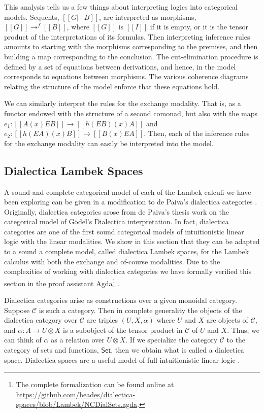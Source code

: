 \documentclass{article}
\let\mto\to                     %
\let\to\relax                   %
\newcommand{\to}{\rightarrow}
\newcommand{\cat}[1]{\mathcal{#1}}
\newcommand{\Set}{\mathsf{Set}}
\begin{document}
This analysis tells us a few things about interpreting logics into
categorical models.  Sequents, $[[G |- B]]$, are interpreted as
morphisms, $[[G]] \mto^f [[B]]$, where $[[G]]$ is $[[I]]$ if it is
empty, or it is the tensor product of the interpretations of its
formulas.  Then interpreting inference rules amounts to starting with
the morphisms corresponding to the premises, and then building a map
corresponding to the conclusion.  The cut-elimination procedure is
defined by a set of equations between derivations, and hence, in the
model corresponds to equations between morphisms.  The various
coherence diagrams relating the structure of the model enforce that
these equations hold.

We can similarly interpret the rules for the exchange modality.
That is, as a functor endowed with the structure of a second comonad,
but also with the maps $e_1 : [[A (x) E B]] \mto [[h(E B) (x) A]]$ and
$e_2 : [[h(E A) (x) B]] \mto [[B (x) E A]]$.  Then, each of the
inference rules for the exchange modality can easily be interpreted
into the model.

\subsection{Dialectica Lambek Spaces}
\label{sec:dialectica_lambek_spaces}

A sound and complete categorical model of each of the Lambek calculi
we have been exploring can be given in a modification to de Paiva's
dialectica categories \cite{depaiva1990}.  Originally, dialectica
categories arose from de Paiva's thesis work on the categorical model
of G\"odel's Dialectica interpretation.  In fact, dialectica
categories are one of the first sound categorical models of
intuitionistic linear logic with the linear modalities.  We show in
this section that they can be adapted to a sound a complete model,
called dialectica Lambek spaces, for the Lambek calculus with both the
exchange and of-course modalities.  Due to the complexities of working
with dialectica categories we have formally verified this section in
the proof assistant Agda\footnote{The complete formalization can be
  found online at
  \url{https://github.com/heades/dialectica-spaces/blob/Lambek/NCDialSets.agda}.}
\cite{bove2009}.

Dialectica categories arise as constructions over a given monoidal
category.  Suppose $\cat{C}$ is such a category.  Then in complete
generality the objects of the dialectica category over $\cat{C}$ are
triples $(U, X, \alpha)$ where $U$ and $X$ are objects of $\cat{C}$,
and $\alpha : A \mto U \otimes X$ is a subobject of the tensor product
in $\cat{C}$ of $U$ and $X$.  Thus, we can think of $\alpha$ as a
relation over $U \otimes X$.  If we specialize the category $\cat{C}$
to the category of sets and functions, $\Set$, then we obtain what is
called a dialectica space. Dialectica spaces are a useful model of
full intuitionistic linear logic \cite{Hyland:1993}.
\end{document}
